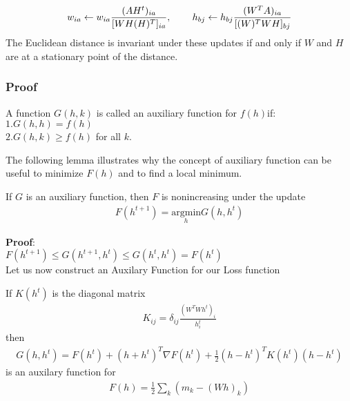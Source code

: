 \documentclass{beamer}
\begin{document}
\begin{spacing}{1.0}
\begin{frame}
\begin{theorem}
\begin{align*}
            w_{ia} \gets w_{ia}\frac{(AH^{t})_{ia}}{[WH(H)^{T}]_{ia}}, \hspace{0.3in}
            h_{bj} \gets h_{bj}\frac{(W^{T}A)_{ia}}{[(W)^{T}WH]_{bj}} 
        \end{align*}
        The Euclidean distance is invariant under these updates if and only if $W$ and $H$ are at
        a stationary point of the distance.
    \end{theorem}
\end{frame}
\begin{frame}
    \frametitle{Proof}
    \begin{definition}
        A function $G(h, k)$ is called an auxiliary function for $f(h) $if:\\
        $1. G(h,h) = f(h)$\\
        $2. G(h,k) \geq f(h)$ for all $k$. 
    \end{definition}
    The following lemma illustrates why the concept of auxiliary function can be useful to
    minimize $F(h)$ and to find a local minimum.
    \begin{lemma}
        If $G$ is an auxiliary function, then $F$ is nonincreasing under the update\\
        \begin{align}
            F(h^{t+1}) = \underset{h}{\mathrm{argmin}}G(h, h^{t})
        \end{align}
    \end{lemma}
\end{frame}
\begin{frame}
    \textbf{Proof}:\\
    $F(h^{t+1}) \leq G(h^{t+1}, h^{t}) \leq G(h^{t}, h^{t}) = F(h^{t})$\\
    Let us now construct an Auxilary Function for our Loss function
    \begin{lemma}
        If $K(h^{t})$ is the diagonal matrix
        \begin{align*}
            K_{ij} = \delta_{ij}\frac{(W^{T}Wh^{t})_{i}}{h_{i}^{t}}
        \end{align*}
        then 
        \begin{align}
            G(h, h^{t}) = F(h^{t}) + (h + h^{t})^{T}\nabla F(h^{t}) + \frac{1}{2}
            (h - h^{t})^{T}K(h^{t})(h - h^{t})
        \end{align}
        is an auxilary function for 
        \begin{align}
            F(h) = \frac{1}{2}\sum_{k}(m_{k} - (Wh)_{k})

\end{align}
\end{lemma}
\end{frame}
\end{spacing}
\end{document}
